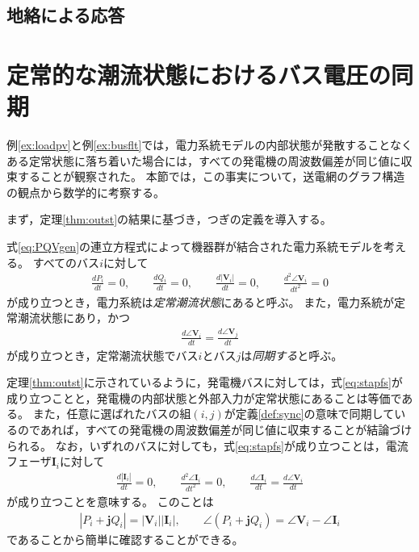 \documentclass[tombow,dvipdfmx]{corona-a5}
\begin{document}
\subsection{地絡による応答}

\begin{例}[バス地絡が発生したときの電力系統モデルの時間応答]\label{ex:busflt}
\end{例}




\section{定常的な潮流状態におけるバス電圧の同期\advanced}\label{sec:phsync}

例\ref{ex:loadpv}と例\ref{ex:busflt}では，電力系統モデルの内部状態が発散することなくある定常状態に落ち着いた場合には，すべての発電機の周波数偏差が同じ値に収束することが観察された。
本節では，この事実について，送電網のグラフ構造の観点から数学的に考察する。

まず，定理\ref{thm:outst}の結果に基づき，つぎの定義を導入する。

\begin{定義}[定常潮流状態とバス電圧の同期]
\label{def:sync}
式\ref{eq:PQVgen}の連立方程式によって機器群が結合された電力系統モデルを考える。
すべてのバス$i$に対して
\begin{align}\label{eq:stapfs}
\frac{dP_i}{dt}=0
,\qquad
\frac{dQ_i}{dt}=0
,\qquad
\frac{d|\bm{V}_i|}{dt}=0
,\qquad
\frac{d^2 \angle \bm{V}_i }{dt^2}=0
\end{align}
が成り立つとき，電力系統は\emph{定常潮流状態}にあると呼ぶ。
また，電力系統が定常潮流状態にあり，かつ
\begin{align}\label{eq:defsyn}
\frac{d \angle \bm{V}_i}{dt} =  \frac{d \angle \bm{V}_j}{dt}
\end{align}
が成り立つとき，定常潮流状態でバス$i$とバス$j$は\emph{同期する}と呼ぶ。
\end{定義}

定理\ref{thm:outst}に示されているように，発電機バスに対しては，式\ref{eq:stapfs}が成り立つことと，発電機の内部状態と外部入力が定常状態にあることは等価である。
また，任意に選ばれたバスの組$(i,j)$が定義\ref{def:sync}の意味で同期しているのであれば，すべての発電機の周波数偏差が同じ値に収束することが結論づけられる。
なお，いずれのバスに対しても，式\ref{eq:stapfs}が成り立つことは，電流フェーザ$\bm{I}_i$に対して
\begin{align*}
\frac{d|\bm{I}_i|}{dt}=0
,\qquad
\frac{d^2 \angle \bm{I}_i }{dt^2}=0
,\qquad
\frac{d \angle \bm{I}_i }{dt} = \frac{d \angle \bm{V}_i }{dt} 
\end{align*}
が成り立つことを意味する。
このことは
\begin{align*}
|P_i + \bm{j} Q_i| = |\bm{V}_i| |\bm{I}_i|
,\qquad
\angle(P_i + \bm{j} Q_i) = \angle \bm{V}_i - \angle \bm{I}_i
\end{align*}
であることから簡単に確認することができる。
\end{document}
